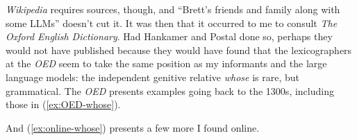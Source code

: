\textit{Wikipedia} requires sources, though, and ``Brett's friends and family along with some LLMs'' doesn't cut it. It was then that it occurred to me to consult \textit{The Oxford English Dictionary}. Had Hankamer and Postal done so, perhaps they would not have published because they would have found that the lexicographers at the \textit{OED} seem to take the same position as my informants and the large language models: the independent genitive relative \textit{whose} is rare, but grammatical. The \textit{OED} presents examples going back to the 1300s, including those in (\ref{ex:OED-whose}). %

\ea \label{ex:OED-whose}
 \z
\z

\noindent And (\ref{ex:online-whose}) presents a few more I found online.

